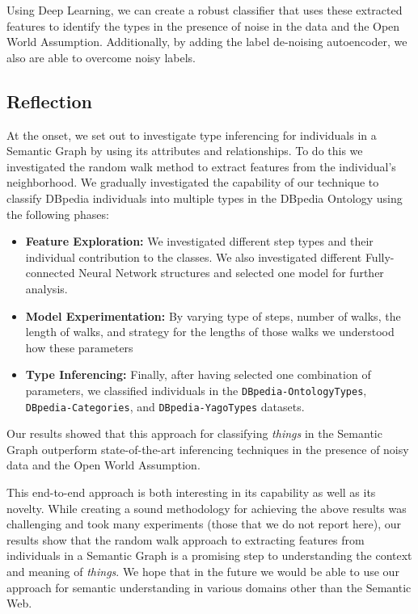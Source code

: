 \documentclass[runningheads,a4paper]{IEEEtran}
\begin{document}
Using Deep Learning, we can create a robust classifier that uses these extracted features to identify the types in the presence of noise in the data and the Open World Assumption. Additionally, by adding the label de-noising autoencoder, we also are able to overcome noisy labels.

\subsection{Reflection}
At the onset, we set out to investigate type inferencing for individuals in a Semantic Graph by using its attributes and relationships. To do this we investigated the random walk method to extract features from the individual's neighborhood. We gradually investigated the capability of our technique to classify DBpedia individuals into multiple types in the DBpedia Ontology using the following phases: 
\begin{itemize}
\item \textbf{Feature Exploration:} We investigated different step types and their individual contribution to the classes. We also investigated different Fully-connected Neural Network structures and selected one model for further analysis.
\item \textbf{Model Experimentation:} By varying type of steps, number of walks, the length of walks, and strategy for the lengths of those walks we understood how these parameters 
\item \textbf{Type Inferencing:} Finally, after having selected one combination of parameters, we classified individuals in the \texttt{DBpedia-OntologyTypes}, \texttt{DBpedia-Categories}, and \texttt{DBpedia-YagoTypes}  datasets. 
\end{itemize}
Our results showed that this approach for classifying \textit{things} in the Semantic Graph outperform state-of-the-art inferencing techniques in the presence of noisy data and the Open World Assumption.

This end-to-end approach is both interesting in its capability as well as its novelty. While creating a sound methodology for achieving the above results was challenging and took many experiments (those that we do not report here), our results show that the random walk approach to extracting features from individuals in a Semantic Graph is a promising step to understanding the context and meaning of \textit{things}. We hope that in the future we would be able to use our approach for semantic understanding in various domains other than the Semantic Web.
\end{document}
